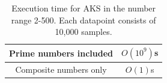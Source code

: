 
\begin{table}
\centering
\caption{Execution time for AKS in the number range 2-500. Each datapoint consists of 10,000 samples.}
\begin{tabular}{|c|c|} \hline
Prime numbers included & $O(10^9)$s\\ \hline
Composite numbers only & $O(1)$s\\ \hline
\end{tabular}
\label{tab:pressure}
\end{table}








